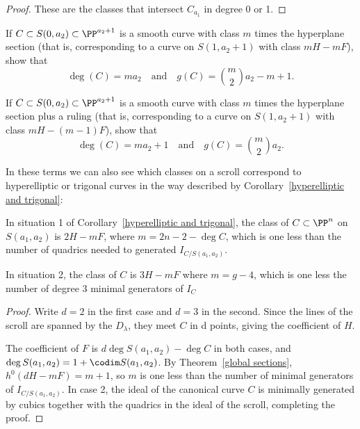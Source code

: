 \begin{proof}
These are the classes that intersect $C_{a_1}$ in degree 0 or 1.
\end{proof}

\begin{exercise}\label{curves on cones}
\item If $C \subset S(0, a_2) \subset \PP^{a_2+1}$ is a smooth curve with class $m$ times the hyperplane section (that is, corresponding to a curve on $S(1,a_2+1)$ with class $mH - mF$), show that
$$
\deg(C) = ma_2 \quad \text{and} \quad g(C) = \binom{m}{2}a_2 - m + 1.
$$
\item If $C \subset S(0, a_2) \subset \PP^{a_2+1}$ is a smooth curve with class $m$ times the hyperplane section plus a ruling (that is, corresponding to a curve on $S(1,a_2+1)$ with class $mH - (m-1)F$), show that
$$
\deg(C) = ma_2 + 1 \quad \text{and} \quad g(C) = \binom{m}{2}a_2.
$$
\end{exercise}

In these terms we can also see which classes on a scroll correspond to hyperelliptic or trigonal curves in the way described by Corollary~\ref{hyperelliptic and trigonal}:

\begin{corollary}\label{which class}
In situation 1 of Corollary~\ref{hyperelliptic and trigonal}, the class of $C\subset \PP^n$ on $S(a_1,a_2)$ is
$2H - mF$, where $m =  2n-2 - \deg C$, which is one less than the number of quadrics needed to generated $I_{C/S(a_1,a_2)}$.

In situation 2, the class of $C$ is 
$3H -  mF$ where $m = g-4$, which is one less the number of degree 3 minimal generators of $I_{C}$
\end{corollary}

\begin{proof} Write $d=2$ in the first case and $d=3$ in the second.
Since the lines of the scroll are spanned by the $D_\lambda$, they meet $C$ in d points, 
giving the coefficient of $H$. 

The coefficient of $F$ is $d\deg S(a_1,a_2) - \deg C$ in both cases, and 
$\deg S(a_1,a_2)= 1+ \codim  S(a_1,a_2)$. By Theorem~\ref{global sections}, 
$h^0(dH-mF) = m+1$, so $m$ is one less than the number of minimal generators
of $I_{C/S(a_1,a_2)}$. In case 2, the ideal of the canonical curve $C$ is minimally
generated by cubics together with  the quadrics in the ideal of the scroll, completing the proof. \end{proof}

